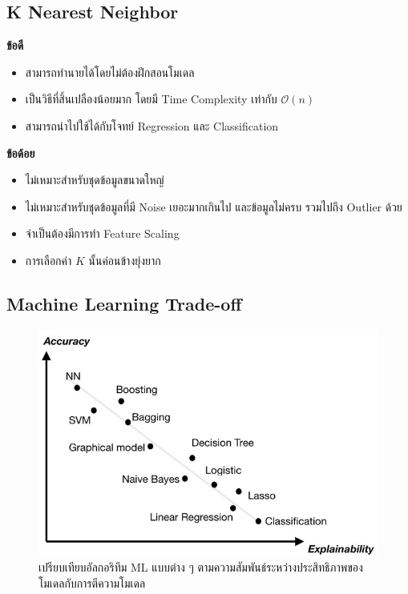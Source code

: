 \subsection{K Nearest Neighbor}
\label{ssec:pros_cons_knn}

\noindent \textbf{ข้อดี}
\begin{itemize}[topsep=0pt]
    \item สามารถทำนายได้โดยไม่ต้องฝึกสอนโมเดล
    
    \item เป็นวิธีที่สิ้นเปลืองน้อยมาก โดยมี Time Complexity เท่ากับ $\mathcal{O}(n)$
    
    \item สามารถนำไปใช้ได้กับโจทย์ Regression และ Classification
\end{itemize}

\noindent \textbf{ข้อด้อย}
\begin{itemize}[topsep=0pt]
    \item ไม่เหมาะสำหรับชุดข้อมูลขนาดใหญ่
    
    \item ไม่เหมาะสำหรับชุดข้อมูลที่มี Noise เยอะมากเกินไป และข้อมูลไม่ครบ รวมไปถึง Outlier ด้วย 
    
    \item จำเป็นต้องมีการทำ Feature Scaling
    
    \item การเลือกค่า $K$ นั้นค่อนข้างยุ่งยาก
\end{itemize}

\subsection{Machine Learning Trade-off}
\label{ssec:ml_trade_off}

\begin{figure}[H]
    \centering
    \includegraphics[width=0.9\linewidth,page=2]{fig/ml-trade-off.jpg}
    \caption{เปรียบเทียบอัลกอริทึม ML แบบต่าง ๆ ตามความสัมพันธ์ระหว่างประสิทธิภาพของโมเดลกับการตีความโมเดล}
    \label{fig:ml_traide}
\end{figure}

